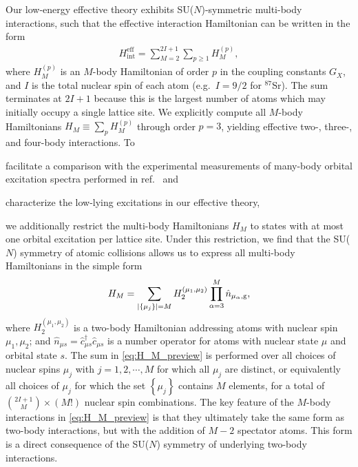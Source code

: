 \documentclass[preprint,showkeys,nofootinbib]{revtex4-1}
\renewcommand{\t}{\text} %
\newcommand{\p}[1]{\left(#1\right)} %
\renewcommand{\set}[1]{\left\{#1\right\}} %
\newcommand{\g}{\text{g}}
\renewcommand{\c}{\hat{c}}
\newcommand{\n}{\hat{n}}
\newcommand{\1}{\mathds{1}}
\begin{document}
Our low-energy effective theory exhibits SU($N$)-symmetric multi-body
interactions, such that the effective interaction Hamiltonian can be
written in the form
\begin{align}
  H_{\t{int}}^{\t{eff}} = \sum_{M=2}^{2I+1} \sum_{p\ge1} H_M^{(p)},
\end{align}
where $H_M^{(p)}$ is an $M$-body Hamiltonian of order $p$ in the
coupling constants $G_X$, and $I$ is the total nuclear spin of each
atom (e.g.~$I=9/2$ for ${}^{87}$Sr).  The sum terminates at $2I+1$
because this is the largest number of atoms which may initially occupy
a single lattice site.  We explicitly compute all $M$-body
Hamiltonians $H_M\equiv\sum_p H_M^{(p)}$ through order $p=3$, yielding
effective two-, three-, and four-body interactions.  To
\begin{enumerate*}
\item facilitate a comparison with the experimental measurements of
  many-body orbital excitation spectra performed in
  ref.~\cite{goban2018emergence} and
\item characterize the low-lying excitations in our effective theory,
\end{enumerate*}
we additionally restrict the multi-body Hamiltonians $H_M$ to states
with at most one orbital excitation per lattice site.  Under this
restriction, we find that the SU($N$) symmetry of atomic collisions
allows us to express all multi-body Hamiltonians in the simple form
\begin{align}
  H_M = \sum_{\abs{\set{\mu_j}}=M}
  H_2^{(\mu_1,\mu_2)} \prod_{\alpha=3}^M \n_{\mu_\alpha,\g},
  \label{eq:H_M_preview}
\end{align}
where $H_2^{(\mu_1,\mu_2)}$ is a two-body Hamiltonian addressing atoms
with nuclear spin $\mu_1,\mu_2$; and
$\n_{\mu s}=\c_{\mu s}^\dag\c_{\mu s}$ is a number operator for atoms
with nuclear state $\mu$ and orbital state $s$.  The sum in
\eqref{eq:H_M_preview} is performed over all choices of nuclear spins
$\mu_j$ with $j=1,2,\cdots,M$ for which all $\mu_j$ are distinct, or
equivalently all choices of $\mu_j$ for which the set $\set{\mu_j}$
contains $M$ elements, for a total of ${2I+1\choose M}\times\p{M!}$
nuclear spin combinations.  The key feature of the $M$-body
interactions in \eqref{eq:H_M_preview} is that they ultimately take
the same form as two-body interactions, but with the addition of $M-2$
spectator atoms.  This form is a direct consequence of the SU($N$)
symmetry of underlying two-body interactions.


\end{document}
